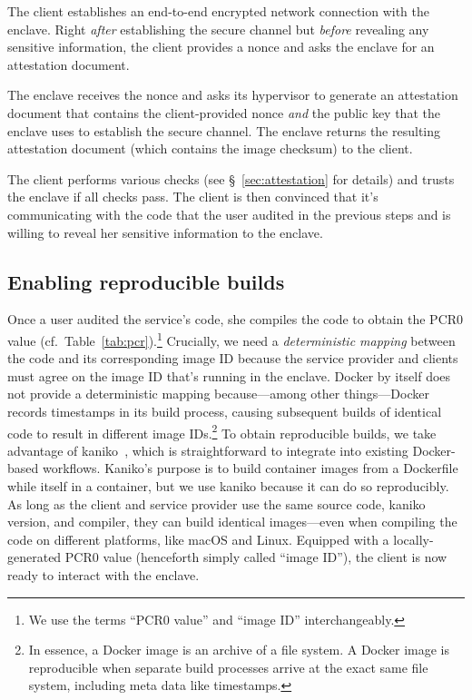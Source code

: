  The client establishes an end-to-end encrypted network connection
with the enclave.  Right \emph{after} establishing the secure channel but
\emph{before} revealing any sensitive information, the client provides a nonce
and asks the enclave for an attestation document.

 The enclave receives the nonce and asks its hypervisor to generate an
attestation document that contains the client-provided nonce \emph{and} the
public key that the enclave uses to establish the secure channel.  The enclave
returns the resulting attestation document (which contains the image checksum)
to the client.

 The client performs various checks (see \S~\ref{sec:attestation} for
details) and trusts the enclave if all checks pass.  The client is then
convinced that it's communicating with the code that the user audited in the
previous steps and is willing to reveal her sensitive information to the
enclave.

\subsection{Enabling reproducible builds}%
\label{sec:build-system}

Once a user audited the service's code, she compiles the code to obtain the PCR0
value (cf.~Table~\ref{tab:pcr}).\footnote{We use the terms ``PCR0 value'' and
``image ID'' interchangeably.}  Crucially, we need a \emph{deterministic
mapping} between the code and its corresponding image ID because the service
provider and clients must agree on the image ID that's running in the enclave.
Docker by itself does not provide a deterministic mapping because---among other
things---Docker records timestamps in its build process, causing subsequent
builds of identical code to result in different image IDs.\footnote{In essence,
a Docker image is an archive of a file system.  A Docker image is reproducible
when separate build processes arrive at the exact same file system, including
meta data like timestamps.}  To obtain reproducible builds, we take advantage of
kaniko~\cite{kaniko}, which is straightforward to integrate into existing
Docker-based workflows.  Kaniko's purpose is to build container images from a
Dockerfile while itself in a container, but we use kaniko because it can do so
reproducibly.  As long as the client and service provider use the same source
code, kaniko version, and compiler, they can build identical images---even when
compiling the code on different platforms, like macOS and Linux.  Equipped with
a locally-generated PCR0 value (henceforth simply called ``image ID''), the
client is now ready to interact with the enclave.

